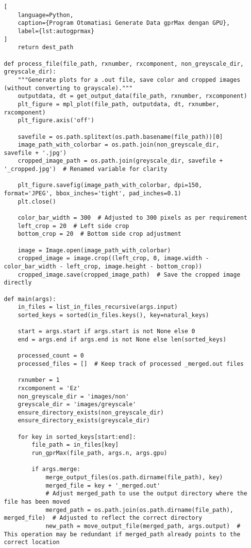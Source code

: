 \begin{lstlisting}[
    language=Python,
    caption={Program Otomatiasi Generate Data gprMax dengan GPU},
    label={lst:autogprmax}
]
    return dest_path

def process_file(file_path, rxnumber, rxcomponent, non_greyscale_dir, greyscale_dir):
    """Generate plots for a .out file, save color and cropped images (without converting to grayscale)."""
    outputdata, dt = get_output_data(file_path, rxnumber, rxcomponent)
    plt_figure = mpl_plot(file_path, outputdata, dt, rxnumber, rxcomponent)
    plt_figure.axis('off')

    savefile = os.path.splitext(os.path.basename(file_path))[0]
    image_path_with_colorbar = os.path.join(non_greyscale_dir, savefile + '.jpg')
    cropped_image_path = os.path.join(greyscale_dir, savefile + '_cropped.jpg')  # Renamed variable for clarity

    plt_figure.savefig(image_path_with_colorbar, dpi=150, format='JPEG', bbox_inches='tight', pad_inches=0.1)
    plt.close()

    color_bar_width = 300  # Adjusted to 300 pixels as per requirement
    left_crop = 20  # Left side crop
    bottom_crop = 20  # Bottom side crop adjustment

    image = Image.open(image_path_with_colorbar)
    cropped_image = image.crop((left_crop, 0, image.width - color_bar_width - left_crop, image.height - bottom_crop))
    cropped_image.save(cropped_image_path)  # Save the cropped image directly

def main(args):
    in_files = list_in_files_recursive(args.input)
    sorted_keys = sorted(in_files.keys(), key=natural_keys)

    start = args.start if args.start is not None else 0
    end = args.end if args.end is not None else len(sorted_keys)

    processed_count = 0
    processed_files = []  # Keep track of processed _merged.out files

    rxnumber = 1
    rxcomponent = 'Ez'
    non_greyscale_dir = 'images/non'
    greyscale_dir = 'images/greyscale'
    ensure_directory_exists(non_greyscale_dir)
    ensure_directory_exists(greyscale_dir)

    for key in sorted_keys[start:end]:
        file_path = in_files[key]
        run_gprMax(file_path, args.n, args.gpu)

        if args.merge:
            merge_output_files(os.path.dirname(file_path), key)
            merged_file = key + '_merged.out'
            # Adjust merged_path to use the output directory where the file has been moved
            merged_path = os.path.join(os.path.dirname(file_path), merged_file)  # Adjusted to reflect the correct directory
            new_path = move_output_file(merged_path, args.output)  # This operation may be redundant if merged_path already points to the correct location


\end{lstlisting}
